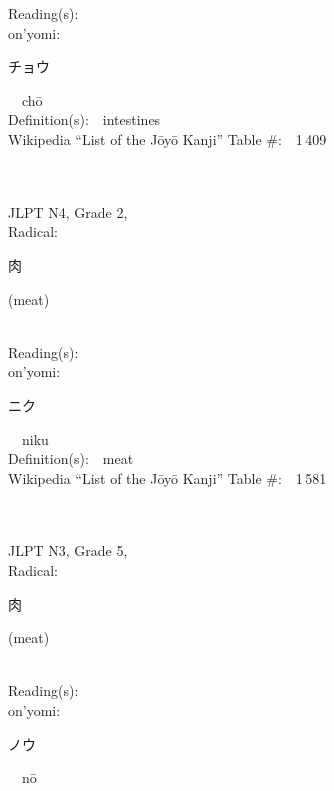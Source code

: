 \begin{multicols}{2}
Reading(s):\ \ \\
{\hspace*{1em}}on'yomi:\ \ \\
{\hspace*{2em}}{\begin{CJK}{UTF8}{min} チョウ \end{CJK}}\ \ ch\=o\ \ \\
Definition(s):\ \ intestines \\
Wikipedia ``List of the J\=oy\=o Kanji'' Table \#:\ \ 1\,409 \\
\ \ \\
{\fontsize{34pt}{40pt}  }\ \ \\  %
{JLPT N4, Grade 2, \\Radical:\ \ {\begin{CJK}{UTF8}{min} 肉 \end{CJK}} (meat) } \\
Reading(s):\ \ \\
{\hspace*{1em}}on'yomi:\ \ \\
{\hspace*{2em}}{\begin{CJK}{UTF8}{min} ニク \end{CJK}}\ \ niku\ \ \\
Definition(s):\ \ meat \\
Wikipedia ``List of the J\=oy\=o Kanji'' Table \#:\ \ 1\,581 \\
\ \ \\
{\fontsize{34pt}{40pt}  }\ \ \\  %
{JLPT N3, Grade 5, \\Radical:\ \ {\begin{CJK}{UTF8}{min} 肉 \end{CJK}} (meat) } \\
Reading(s):\ \ \\
{\hspace*{1em}}on'yomi:\ \ \\
{\hspace*{2em}}{\begin{CJK}{UTF8}{min} ノウ \end{CJK}}\ \ n\=o\ \ \\

\end{multicols}
